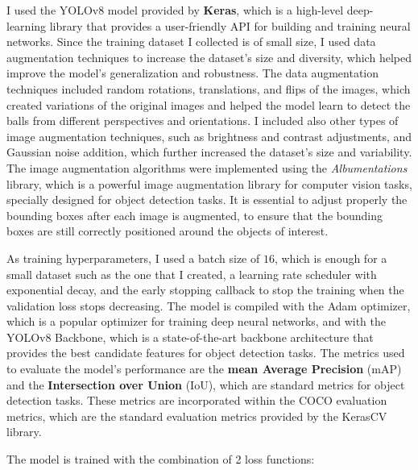 I used the YOLOv8 model provided by \textbf{Keras}, which is a high-level deep-learning library that provides a user-friendly
API for building and training neural networks. Since the training dataset I collected is of small size,
I used data augmentation techniques to increase the dataset's size and diversity, which helped improve the model's
generalization and robustness. The data augmentation techniques included random rotations, translations, and flips
of the images, which created variations of the original images and helped the model learn to detect the balls
from different perspectives and orientations. I included also other types of image augmentation techniques, such as
brightness and contrast adjustments, and Gaussian noise addition, which further increased the dataset's
size and variability. The image augmentation algorithms were implemented using the \textit{Albumentations} library,
which is a powerful image augmentation library for computer vision tasks, specially designed for 
object detection tasks. It is essential to adjust properly the bounding boxes after each image
is augmented, to ensure that the bounding boxes are still correctly positioned around the objects of interest.

As training hyperparameters, I used a batch size of $16$, which is enough for a small dataset such as the one
that I created, a learning rate scheduler with exponential decay, and the early stopping callback to stop the training
when the validation loss stops decreasing. The model is compiled with the Adam optimizer, which is a popular optimizer
for training deep neural networks, and with the YOLOv8 Backbone, which is a state-of-the-art backbone architecture
that provides the best candidate features for object detection tasks. The metrics used to evaluate the model's performance
are the \textbf{mean Average Precision} (mAP) and the \textbf{Intersection over Union} (IoU),
which are standard metrics for object detection tasks. These metrics are incorporated within the COCO evaluation metrics,
which are the standard evaluation metrics provided by the KerasCV library.

The model is trained with the combination of 2 loss functions:

